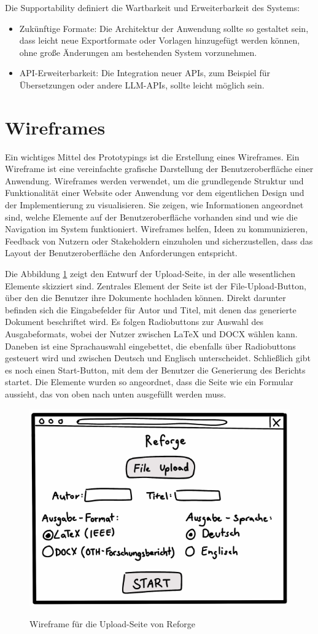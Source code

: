 Die Supportability definiert die Wartbarkeit und Erweiterbarkeit des Systems:
\begin{itemize}
    \item Zukünftige Formate: Die Architektur der Anwendung sollte so gestaltet sein, dass leicht neue Exportformate oder Vorlagen hinzugefügt werden können, ohne große Änderungen am bestehenden System vorzunehmen.
    \item \ac{API}-Erweiterbarkeit: Die Integration neuer \ac{API}s, zum Beispiel für Übersetzungen oder andere \ac{LLM}-\ac{API}s, sollte leicht möglich sein.
\end{itemize}
\section{Wireframes}
\label{sec:wireframe}
Ein wichtiges Mittel des Prototypings ist die Erstellung eines Wireframes. Ein Wireframe ist eine vereinfachte grafische Darstellung der Benutzeroberfläche einer Anwendung. Wireframes werden verwendet, um die grundlegende Struktur und Funktionalität einer Website oder Anwendung vor dem eigentlichen Design und der Implementierung zu visualisieren. Sie zeigen, wie Informationen angeordnet sind, welche Elemente auf der Benutzeroberfläche vorhanden sind und wie die Navigation im System funktioniert. Wireframes helfen, Ideen zu kommunizieren, Feedback von Nutzern oder Stakeholdern einzuholen und sicherzustellen, dass das Layout der Benutzeroberfläche den Anforderungen entspricht. \cite[S.119]{preim2015interaktive}

Die Abbildung \ref{fig:wireframe_upload} zeigt den Entwurf der Upload-Seite, in der alle wesentlichen Elemente skizziert sind. Zentrales Element der Seite ist der File-Upload-Button, über den die Benutzer ihre Dokumente hochladen können. Direkt darunter befinden sich die Eingabefelder für Autor und Titel, mit denen das generierte Dokument beschriftet wird. Es folgen Radiobuttons zur Auswahl des Ausgabeformats, wobei der Nutzer zwischen LaTeX und \ac{DOCX} wählen kann. Daneben ist eine Sprachauswahl eingebettet, die ebenfalls über Radiobuttons gesteuert wird und zwischen Deutsch und Englisch unterscheidet. Schließlich gibt es noch einen Start-Button, mit dem der Benutzer die Generierung des Berichts startet. Die Elemente wurden so angeordnet, dass die Seite wie ein Formular aussieht, das von oben nach unten ausgefüllt werden muss. 

\begin{figure}[H]
\centering
\includegraphics[width=0.5\linewidth]{Images/wireframe_upload.pdf}\\
\caption{Wireframe für die Upload-Seite von Reforge}
\label{fig:wireframe_upload}
\end{figure}

